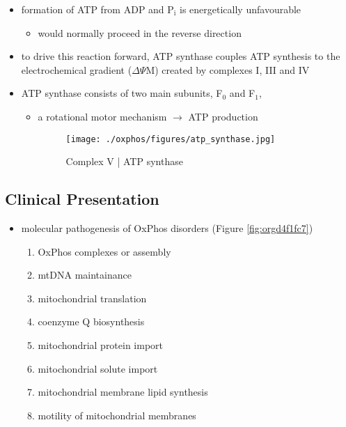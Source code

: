 \documentclass{scrartcl}
\begin{document}
\begin{enumerate}
{\small{}}

\begin{itemize}
\item formation of ATP from ADP and P\(_{\text{i}}\) is energetically unfavourable
\begin{itemize}
\item would normally proceed in the reverse direction
\end{itemize}

\item to drive this reaction forward, ATP synthase couples ATP synthesis
to the electrochemical gradient (\(\Delta \Psi\)M) created by complexes
I, III and IV
\item ATP synthase consists of two main subunits, F\(_{\text{0}}\) and F\(_{\text{1}}\),
\begin{itemize}
\item a rotational motor mechanism \(\to\) ATP production

\begin{figure}[htbp]
\centering
\texttt{[image: ./oxphos/figures/atp\_synthase.jpg]}
\caption{\label{fig:org850cc00}
Complex V | ATP synthase}
\end{figure}
\end{itemize}
\end{itemize}
\end{enumerate}

\subsection{Clinical Presentation}
\label{sec:org9a21c90}
\begin{itemize}
\item molecular pathogenesis of OxPhos disorders (Figure \ref{fig:orgd4f1fc7})
\begin{enumerate}
\item OxPhos complexes or assembly
\item mtDNA maintainance
\item mitochondrial translation
\item coenzyme Q biosynthesis
\item mitochondrial protein import
\item mitochondrial solute import
\item mitochondrial membrane lipid synthesis
\item motility of mitochondrial membranes
\end{enumerate}
\end{itemize}
\end{document}
